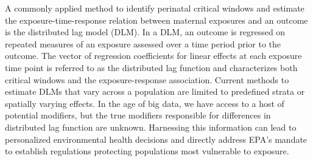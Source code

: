 \documentclass[12pt]{article}
\begin{document}

A commonly applied method to identify perinatal critical windows and estimate the exposure-time-response relation between maternal exposures and an outcome is the distributed lag model (DLM). In a DLM, an outcome is regressed on repeated measures of an exposure assessed over a time period prior to the outcome. The vector of regression coefficients for linear effects at each exposure time point is referred to as the distributed lag function and characterizes both critical windows and the exposure-response association. Current methods to estimate DLMs that vary across a population are limited to predefined strata or spatially varying effects. In the age of big data, we have access to a host of potential modifiers, but the true modifiers responsible for differences in distributed lag function are unknown. Harnessing this information can lead to personalized environmental health decisions and directly address EPA's mandate to establish regulations protecting populations most vulnerable to exposure.  


\end{document}
